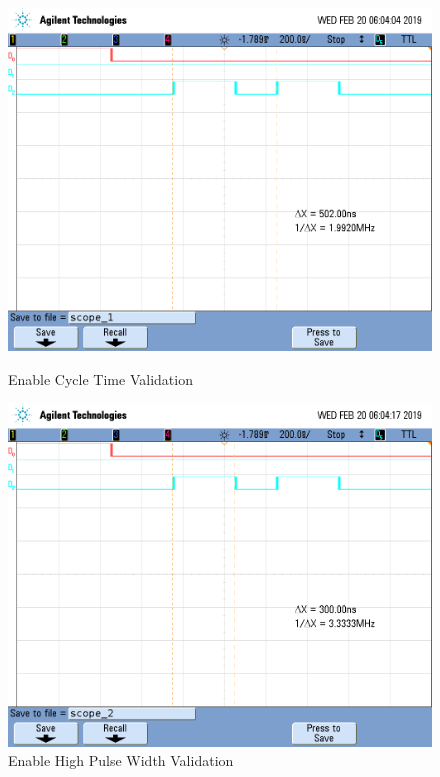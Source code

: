 \documentclass[a4paper, 12pt]{article}
\begin{document}
\begin{figure}[htb]
\centering
\includegraphics[width=.8\textwidth]{0.png}
\caption{Enable Cycle Time Validation}
\includegraphics[width=.8\textwidth]{1.png}
\caption{Enable High Pulse Width Validation}
\end{figure}
\end{document}
